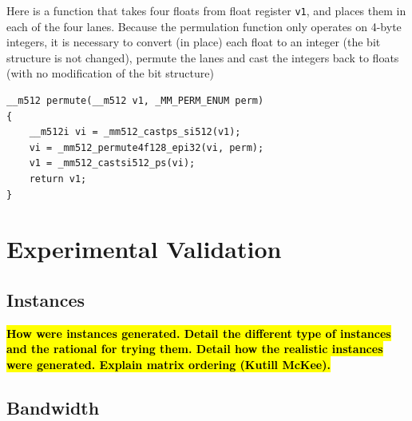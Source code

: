 \documentclass[10pt,conference,compsocconf]{IEEEtran}
\def\ttt#1{{\tt #1}}
\newcommand{\todo}[1]{{\color{red}\textbf{\hl{#1}}\xspace}}
\begin{document}
Here is a function that takes four floats from float register \ttt{v1}, and 
places them in each of the four lanes. Because the permulation function only 
operates on 4-byte integers, it is necessary to convert (in place) each float
to an integer (the bit structure is not changed), permute the lanes and cast
the integers back to floats (with no modification of the bit structure)
\begin{verbatim}
__m512 permute(__m512 v1, _MM_PERM_ENUM perm)                                           
{
    __m512i vi = _mm512_castps_si512(v1);
    vi = _mm512_permute4f128_epi32(vi, perm);
    v1 = _mm512_castsi512_ps(vi);
    return v1;
}
\end{verbatim}







\section{Experimental Validation}
\label{sec:expe}

\subsection{Instances}

\todo{How were instances generated. Detail the different type of
  instances and the rational for trying them. Detail how the realistic
  instances were generated. Explain matrix ordering (Kutill McKee).}

\subsection{Bandwidth}
\end{document}
